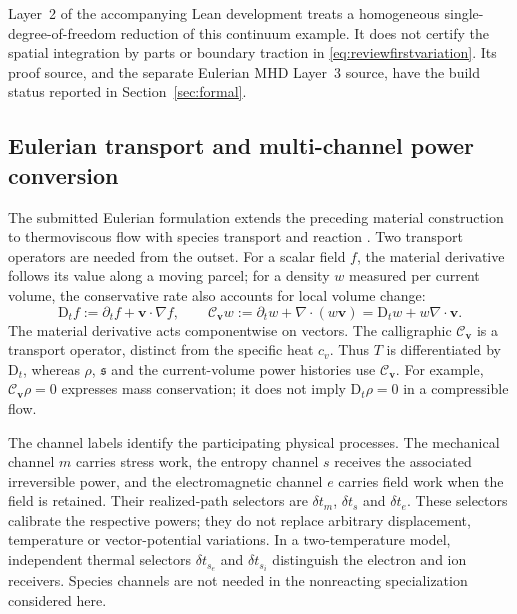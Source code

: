 \documentclass[11pt,a4paper]{article}
\theoremstyle{remark}\newtheorem{remark}{Remark}
\numberwithin{equation}{section}
\newcommand{\vv}{\boldsymbol v}
\newcommand{\grad}{\nabla}
\newcommand{\diver}{\nabla\!\cdot}
\newcommand{\Dt}{\mathrm D_t}
\newcommand{\Cv}{\mathcal C_{\vv}}
\newcommand{\st}{\mathfrak s}
\begin{document}
Layer~2 of the accompanying Lean development treats a homogeneous single-degree-of-freedom reduction of this continuum example. It does not certify the spatial integration by parts or boundary traction in \eqref{eq:reviewfirstvariation}. Its proof source, and the separate Eulerian MHD Layer~3 source, have the build status reported in Section~\ref{sec:formal}.

\subsection{Eulerian transport and multi-channel power conversion}
The submitted Eulerian formulation extends the preceding material construction to thermoviscous flow with species transport and reaction \citep{RenEulerian}. Two transport operators are needed from the outset. For a scalar field $f$, the material derivative follows its value along a moving parcel; for a density $w$ measured per current volume, the conservative rate also accounts for local volume change:
\begin{equation}
\Dt f:=\partial_t f+\vv\cdot\grad f,\qquad
\Cv w:=\partial_t w+\diver(w\vv)
=\Dt w+w\diver\vv.
\label{eq:reviewrates}
\end{equation}
The material derivative acts componentwise on vectors. The calligraphic $\Cv$ is a transport operator, distinct from the specific heat $c_v$. Thus $T$ is differentiated by $\Dt$, whereas $\rho$, $\st$ and the current-volume power histories use $\Cv$. For example, $\Cv\rho=0$ expresses mass conservation; it does not imply $\Dt\rho=0$ in a compressible flow.

The channel labels identify the participating physical processes. The mechanical channel $m$ carries stress work, the entropy channel $s$ receives the associated irreversible power, and the electromagnetic channel $e$ carries field work when the field is retained. Their realized-path selectors are $\delta t_m$, $\delta t_s$ and $\delta t_e$. These selectors calibrate the respective powers; they do not replace arbitrary displacement, temperature or vector-potential variations. In a two-temperature model, independent thermal selectors $\delta t_{s_e}$ and $\delta t_{s_i}$ distinguish the electron and ion receivers. Species channels are not needed in the nonreacting specialization considered here.
\end{document}
